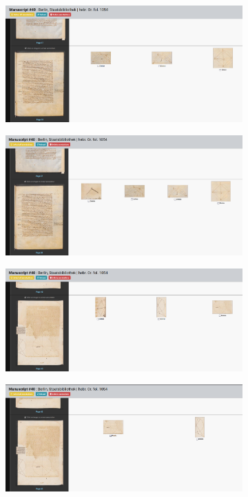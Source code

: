 		   	\begin{figure}[H]
			\begin{subfigure}{1\linewidth}
				\centering
				\includegraphics[width=10.5cm]{images/ms40_p28_docext.png}
			\end{subfigure}
			\hspace{1pt}
			\begin{subfigure}{1\linewidth}
				\centering
				\includegraphics[width=10.5cm]{images/ms40_p28_yolov5.png}
			\end{subfigure}
			\begin{subfigure}{1\linewidth}
				\centering
				\includegraphics[width=10.5cm]{images/ms40_p45_docext.png}
			\end{subfigure}
			\hspace{1pt}
			\begin{subfigure}{1\linewidth}
				\centering
				\includegraphics[width=10.5cm]{images/ms40_p45_yolov5.png}

\end{subfigure}
\end{figure}
